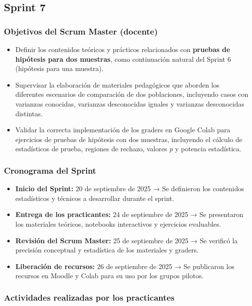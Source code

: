 \documentclass[letter,oneside,12pt,spanish]{report}
\begin{document}
\subsection{Sprint 7}

\subsubsection*{Objetivos del Scrum Master (docente)}
\begin{itemize}
	\item Definir los contenidos teóricos y prácticos relacionados con \textbf{pruebas de hipótesis para dos muestras}, como continuación natural del Sprint 6 (hipótesis para una muestra).
	\item Supervisar la elaboración de materiales pedagógicos que aborden los diferentes escenarios de comparación de dos poblaciones, incluyendo casos con varianzas conocidas, varianzas desconocidas iguales y varianzas desconocidas distintas.
	\item Validar la correcta implementación de los graders en Google Colab para ejercicios de pruebas de hipótesis con dos muestras, incluyendo el cálculo de estadísticos de prueba, regiones de rechazo, valores \textit{p} y potencia estadística.
\end{itemize}

\subsubsection*{Cronograma del Sprint}
\begin{itemize}
	\item \textbf{Inicio del Sprint:} 20 de septiembre de 2025 → Se definieron los contenidos estadísticos y técnicos a desarrollar durante el sprint.
	\item \textbf{Entrega de los practicantes:} 24 de septiembre de 2025 → Se presentaron los materiales teóricos, notebooks interactivos y ejercicios evaluables.
	\item \textbf{Revisión del Scrum Master:} 25 de septiembre de 2025 → Se verificó la precisión conceptual y estadística de los materiales y graders.
	\item \textbf{Liberación de recursos:} 26 de septiembre de 2025 → Se publicaron los recursos en Moodle y Colab para su uso por los grupos pilotos.
\end{itemize}

\subsubsection*{Actividades realizadas por los practicantes}
\end{document}
